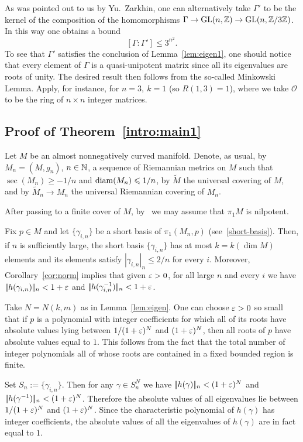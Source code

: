 \documentclass{amsart}
\begin{document}
\begin{rmk}
As was pointed out to us by Yu.~Zarkhin, one can alternatively take
$\Gamma'$ to be the kernel of the composition of the homomorphisms
$\Gamma\to \mathrm{GL}(n,{\Bbb Z})\z\to \mathrm{GL}(n,{\Bbb Z}/3{\Bbb Z})$.
In this way one obtains a bound
$$[\Gamma:\Gamma']\le 3^{n^2}.$$
To see that $\Gamma'$ satisfies the conclusion of
Lemma~\ref{lem:eigen1}, one should notice that every element of
$\Gamma$ is a quasi-unipotent matrix since all its eigenvalues are
roots of unity.
The desired result then follows from the so-called
Minkowski Lemma.
Apply, for instance, \cite[Th. 7.2]{Zar} for $n=3,\
k=1$ (so $R(1,3)=1$), where we take $\mathcal O$ to  be the ring of
$n\times n$ integer matrices.
\end{rmk}


\subsection{Proof of Theorem~\ref{intro:main1}}
Let $M$ be an almost nonnegatively curved manifold.
Denote, as usual, by $M_n=(M,g_n)$, $n\in {\Bbb N}$,
a sequence of Riemannian metrics on $M$ such that $\sec(M_n)\ge -1/n$
and $\operatorname{\rm diam}(M_n)\leqslant 1/n$,
by $\tilde M$ the universal covering of $M$, and by
$\tilde M_n\to M_n$
the universal Riemannian covering of $M_n$.

After passing to a finite cover of $M$, by~\cite{FY}
we may assume that
 $\pi_1M$ is nilpotent.

Fix $p\in M$ and
let $\{\gamma_{i,n}\}$ be a short basis of $\pi_1(M_n,p)$ (see~\ref{short-basis}).
Then, if $n$ is sufficiently large,
the short basis $\{\gamma_{i,n}\}$
has at most $k=k(\dim M)$ elements and
its elements satisfy
$|\gamma_{i,n}|_n\le 2/n$ for every $i$.
Moreover,
Corollary~\ref{cor:norm}  implies
that given $\varepsilon>0$, for all large $n$ and every $i$
we have $|\!|h(\gamma_{i,n})|\!|_n <
1+\varepsilon$ and $|\!|h(\gamma^{-1}_{i,n})|\!|_n<1+\varepsilon$.

Take $N=N(k,m)$ as in Lemma~\ref{lem:eigen}.
One can choose $\varepsilon>0$
so small that
if $p$ is a polynomial with integer coefficients
for which all of its roots have  absolute
values lying between  $1/(1+\varepsilon)^N$ and $(1+\varepsilon)^N$,
then  all roots of $p$ have absolute values equal to $1$.
This follows from the fact
that the total number of integer polynomials
all of whose roots are contained in a fixed bounded region is finite.


Set $S_n:=\{\gamma_{i,n}\}$.
Then for any $\gamma\in S_n^N$ we have
$|\!|h(\gamma)|\!|_n<(1+\varepsilon)^N$ and
$|\!|h(\gamma^{-1})|\!|_n<(1+\varepsilon)^N$.
Therefore the absolute values of all eigenvalues
lie between $1/(1+\varepsilon)^N$ and $(1+\varepsilon)^N$.
Since the characteristic polynomial of $h(\gamma)$
has integer coefficients,
the absolute values of all the eigenvalues of $h(\gamma)$ are
in fact equal to $1$.
\end{document}

